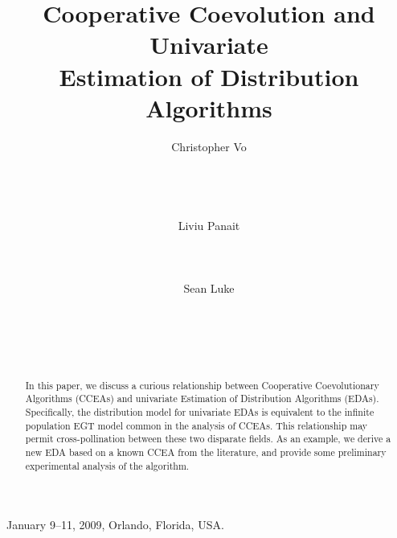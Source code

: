 \documentclass{sig-alt-full}
\begin{document}
 {January 9--11, 2009, Orlando, Florida, USA.} 


\title{Cooperative Coevolution and Univariate \\Estimation of Distribution Algorithms}

\author{
Christopher Vo\\
       \\
       \\
       \\
       \\
\alignauthor
Liviu Panait\\
       \\
       \\
       \\
\alignauthor
Sean Luke\\
       \\
       \\
       \\
       \\
}
\maketitle

\begin{abstract}
In this paper, we discuss a curious relationship between Cooperative Coevolutionary Algorithms (CCEAs) and univariate Estimation of Distribution Algorithms (EDAs).  Specifically, the distribution model for univariate EDAs is equivalent to the infinite population EGT model common in the analysis of CCEAs. This relationship may permit cross-pollination between these two disparate fields. As an example, we derive a new EDA based on a known CCEA from the literature, and provide some preliminary experimental analysis of the algorithm.
\end{abstract}

\end{document}
